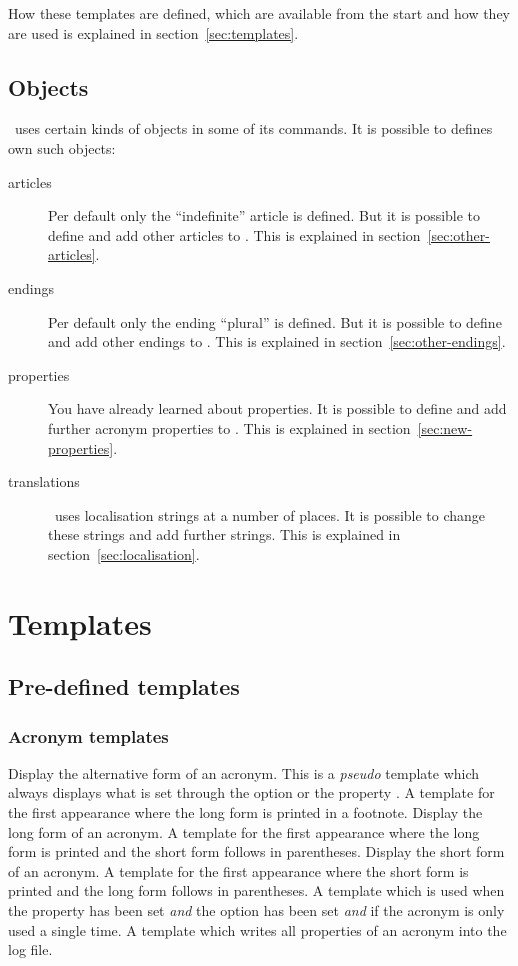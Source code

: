 \documentclass{acro-manual}
\begin{document}
How these templates are defined, which are available from the start and how
they are used is explained in section~\vref{sec:templates}.

\subsection{Objects}
\acro\ uses certain kinds of objects in some of its commands.  It is possible
to defines own such objects:
\begin{description}
  \item[articles] Per default only the \enquote{indefinite} article is
    defined. But it is possible to define and add other articles to \acro.
    This is explained in section~\vref{sec:other-articles}.
  \item[endings] Per default only the ending \enquote{plural} is defined. But
    it is possible to define and add other endings to \acro.  This is
    explained in section~\vref{sec:other-endings}.
  \item[properties] You have already learned about properties.  It is possible
    to define and add further acronym properties to \acro.  This is explained
    in section~\vref{sec:new-properties}.
  \item[translations] \acro\ uses localisation strings at a number of places.
    It is possible to change these strings and add further strings.  This is
    explained in section~\vref{sec:localisation}.
\end{description}

\section{Templates}\label{sec:templates}
\subsection{Pre-defined templates}\label{sec:pre-defin-templ}
\subsubsection{Acronym templates}
\begin{templates}
    Display the alternative form of an acronym.
    This is a \emph{pseudo} template which always displays what is
    set through the option  or the property
    .
    A template for the first appearance where the long form is printed in a
    footnote.
    Display the long form of an acronym.
    A template for the first appearance where the long form is printed and the
    short form follows in parentheses.
    Display the short form of an acronym.
    A template for the first appearance where the short form is printed and the
    long form follows in parentheses.
    A template which is used when the property  has been set
    \emph{and} the option  has been set \emph{and} if the
    acronym is only used a single time.
    A template which writes all properties of an acronym into the log file.
\end{templates}
\end{document}
